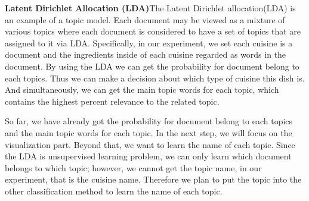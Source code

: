 \documentclass{article}
\begin{document}
\textbf{Latent Dirichlet Allocation (LDA)}The Latent Dirichlet allocation(LDA) is an example of a topic model. Each document may be viewed as a mixture of various topics where each document is considered to have a set of topics that are assigned to it via LDA. Specifically, in our experiment, we set each cuisine is a document and the ingredients inside of each cuisine regarded as words in the document. By using the LDA we can get the probability for document belong to each topics. Thus we can make a decision about which type of cuisine this dish is. And simultaneously, we can get the main topic words for each topic, which contains the highest percent relevance to the related topic. 

So far, we have already got the probability for document belong to each topics and the main topic words for each topic. In the next step, we will focus on the visualization part. Beyond that, we want to learn the name of each topic. Since the LDA is unsupervised learning problem, we can only learn which document belongs to which topic; however, we cannot get the topic name, in our experiment, that is the cuisine name. Therefore we plan to put the topic into the other classification method to learn the name of each topic. 
\end{document}
